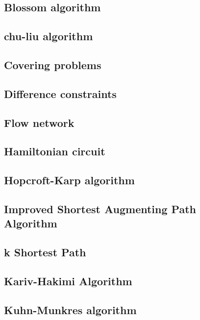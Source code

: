 \documentclass[a4paper,5pt,twocolumn,titlepage]{article}
\begin{document}
\subsection{Blossom algorithm}

\subsection{chu-liu algorithm}

\subsection{Covering problems}

\subsection{Difference constraints}

\subsection{Flow network}

\subsection{Hamiltonian circuit}

\subsection{Hopcroft-Karp algorithm}

\subsection{Improved Shortest Augmenting Path Algorithm}

\subsection{k Shortest Path}

\subsection{Kariv-Hakimi Algorithm}

\subsection{Kuhn-Munkres algorithm}

\end{document}
